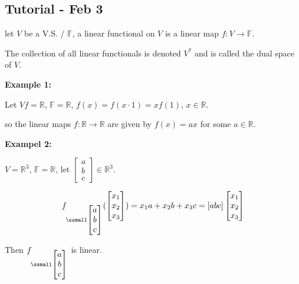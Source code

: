 \documentclass[12pt]{article}
\theoremstyle{plain}
\newcommand{\mR}{{\mathbb{R}}}
\newcommand{\mF}{{\mathbb{F}}}
\begin{document}
		

		\newpage
		\subsection{Tutorial - Feb 3}
		
		let $V$ be a V.S. / $\mF$, a linear functional on $V$ is a linear 
		map $f: V \to \mF$. 

		The collection of all linear functionals is denoted $V^*$ and is called
		the dual space of $V$. 
		
		{\color{Brown}
			\textbf{Example 1: }

			Let $Vf = \mR$, $\mF = \mR$, $f(x)= f(x\cdot 1)= xf(1)$, 
			$x \in \mR$. 

			so the linear maps $f: \mR \to \mR$ are given by $f(x) = ax$ 
			for some $a \in \mR$. 

			\textbf{Exampel 2: }

			$V = \mR^3$, $\mF = \mR$, let $\begin{bmatrix}
				a\\
				b\\
				c
			\end{bmatrix} \in \mR^3$. 

			\[
				f_{\ssmall\begin{bmatrix}
				a\\
				b\\
				c
			\end{bmatrix}}(\begin{bmatrix}
			x_1\\
			x_2\\
			x_3
		\end{bmatrix}) = x_1a+x_2b+x_3c = [a b c] 
		\begin{bmatrix}
			x_1\\
			x_2\\
			x_3
		\end{bmatrix}
		\]

		Then $f_{\ssmall\begin{bmatrix}
				a\\
				b\\
				c
			\end{bmatrix}}$ is linear. 

		}
\end{document}
